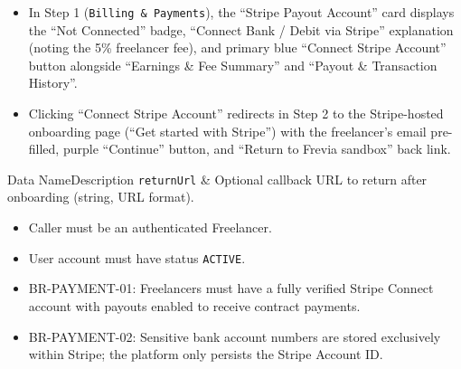 \begin{itemize}[leftmargin=1.6em,topsep=3pt,itemsep=2pt,parsep=0pt,label=$\bullet$]
      \item In Step 1 (\texttt{Billing \& Payments}), the ``Stripe Payout Account'' card displays the ``Not Connected'' badge, ``Connect Bank / Debit via Stripe'' explanation (noting the 5\% freelancer fee), and primary blue ``Connect Stripe Account'' button alongside ``Earnings \& Fee Summary'' and ``Payout \& Transaction History''.
      \item Clicking ``Connect Stripe Account'' redirects in Step 2 to the Stripe-hosted onboarding page (``Get started with Stripe'') with the freelancer's email pre-filled, purple ``Continue'' button, and ``Return to Frevia sandbox'' back link.
\end{itemize}


\begin{specdatatable}{Data Name}{Description}
      \texttt{returnUrl} & Optional callback URL to return after onboarding (string, URL format).\\ \hline
\end{specdatatable}

\begin{itemize}[leftmargin=1.6em,topsep=3pt,itemsep=2pt,parsep=0pt,label=$\bullet$]
      \item Caller must be an authenticated Freelancer.
      \item User account must have status \texttt{ACTIVE}.
\end{itemize}

\begin{itemize}[leftmargin=1.6em,topsep=3pt,itemsep=2pt,parsep=0pt,label=$\bullet$]\brrulelist
      \item BR-PAYMENT-01: Freelancers must have a fully verified Stripe Connect account with payouts enabled to receive contract payments.
      \item BR-PAYMENT-02: Sensitive bank account numbers are stored exclusively within Stripe; the platform only persists the Stripe Account ID.
\end{itemize}


